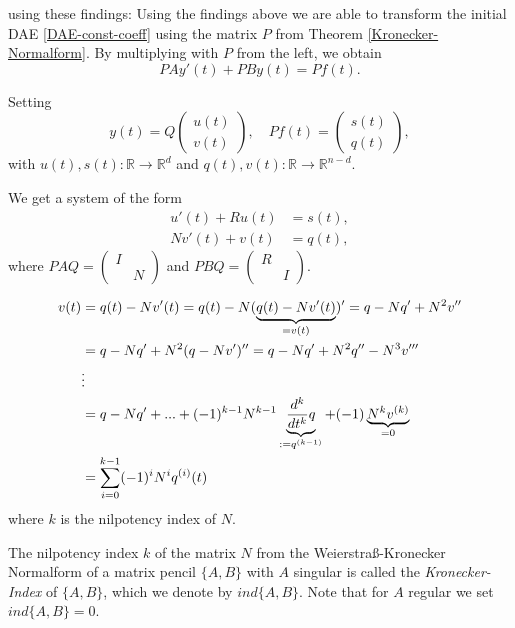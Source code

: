 	\begin{frame}
		using these findings:
		Using the findings above we are able to transform the initial DAE \eqref{DAE-const-coeff} using the matrix $P$ from Theorem \ref{Kronecker-Normalform}. By multiplying with $P$ from the left, we obtain
		\begin{displaymath}
			P A y'(t) + P B y(t) = P f(t) .
		\end{displaymath}
		
		Setting
		\begin{displaymath}
			y(t) = Q
			\left(
			\begin{matrix}
				u(t) \\
				v(t)
			\end{matrix}  
			\right) 
			, \quad
			Pf(t) = 
			\left(
			\begin{matrix}
				s(t) \\
				q(t)
			\end{matrix}
			\right),
		\end{displaymath}
		with $u(t),s(t) : \mathbb{R} \to \mathbb{R}^d$ and $q(t),v(t) : \mathbb{R} \to \mathbb{R}^{n-d}$.
		
		We get a system of the form
		\begin{equation}
			\label{transformed-DAE-const-coeff}
			\begin{aligned}
				u'(t) + Ru(t) &= s(t), \\
				Nv'(t) + v(t) &= q(t),
			\end{aligned}
		\end{equation}
		where $PAQ = 
		\left( 
		\begin{matrix}
			I & \\
			& N
		\end{matrix} 
		\right)$
		and $PBQ = 
		\left( 
		\begin{matrix}
			R & \\
			& I
		\end{matrix} 
		\right)$.
	\end{frame}
	
	\begin{frame}
		\begin{align}
			\notag
			v(t) &= q(t) - Nv'(t) = q(t) - N(\underbrace{q(t)-Nv'(t)}_{=v(t)})' = q-Nq'+N^2v'' \\ \notag
			&= q-Nq'+N^2(q-Nv')'' = q-Nq'+N^2q''-N^3v''' \\ \notag
			&\vdots \\ \notag
			&= q-Nq'+...+(-1)^{k-1}N^{k-1}\underbrace{\frac{d^k}{dt^k}q}_{:=q^{(k-1)}}+(-1) \underbrace{N^kv^{(k)}}_{=0}\\ 
			\label{solution-to-transformed-DAE-const-coeff-part2}
			&= \sum_{i=0}^{k-1} (-1)^iN^iq^{(i)}(t)
		\end{align}
		where $k$ is the nilpotency index of $N$.
		\begin{definition}
			The nilpotency index $k$ of the matrix $N$ from the Weierstraß-Kronecker Normalform of a matrix pencil $\{A,B\}$ with $A$ singular is called the \emph{Kronecker-Index} of $\{A,B\}$, which we denote by $ind\{A,B\}$. Note that for $A$ regular we set $ind\{A,B\} = 0$.
		\end{definition}
	\end{frame}
	
